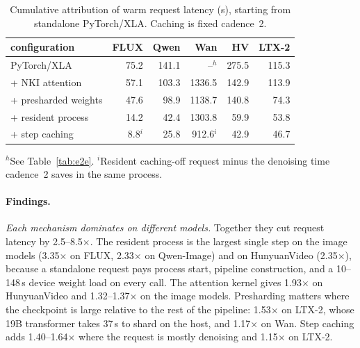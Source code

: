 \begin{table}[t]
\caption{Cumulative attribution of warm request latency (s), starting from standalone PyTorch/XLA. Caching is fixed cadence~2.}
\label{tab:attribution}
\centering
\footnotesize
\setlength{\tabcolsep}{3.2pt}
\begin{tabular}{@{}lrrrrr@{}}
\toprule
configuration & FLUX & Qwen & Wan & HV & LTX-2 \\
\midrule
PyTorch/XLA             & 75.2 & 141.1 & --$^{h}$ & 275.5 & 115.3 \\
+ NKI attention         & 57.1 & 103.3 & 1336.5 & 142.9 & 113.9 \\
+ presharded weights    & 47.6 & 98.9  & 1138.7 & 140.8 & 74.3 \\
+ resident process      & 14.2 & 42.4  & 1303.8 & 59.9  & 53.8 \\
+ step caching          & 8.8$^{i}$ & 25.8 & 912.6$^{i}$ & 42.9 & 46.7 \\
\bottomrule
\end{tabular}
\par\smallskip
{\raggedright\scriptsize $^{h}$See Table~\ref{tab:e2e}. $^{i}$Resident caching-off request minus the denoising time cadence~2 saves in the same process.\par}
\vskip -0.1in
\end{table}

\paragraph{Findings.}
\emph{Each mechanism dominates on different models.} Together they cut request latency by 2.5--8.5$\times$. The resident process is the largest single step on the image models (3.35$\times$ on FLUX, 2.33$\times$ on Qwen-Image) and on HunyuanVideo (2.35$\times$), because a standalone request pays process start, pipeline construction, and a 10--148\,s device weight load on every call. The attention kernel gives 1.93$\times$ on HunyuanVideo and 1.32--1.37$\times$ on the image models. Presharding matters where the checkpoint is large relative to the rest of the pipeline: 1.53$\times$ on LTX-2, whose 19B transformer takes 37\,s to shard on the host, and 1.17$\times$ on Wan. Step caching adds 1.40--1.64$\times$ where the request is mostly denoising and 1.15$\times$ on LTX-2.

